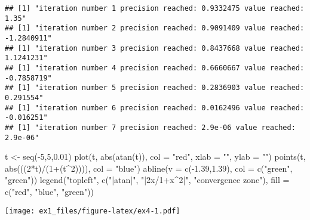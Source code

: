 \documentclass[
]{article}
\newenvironment{Shaded}{\begin{snugshade}}{\end{snugshade}}
\newcommand{\AttributeTok}[1]{\textcolor[rgb]{0.77,0.63,0.00}{#1}}
\newcommand{\DecValTok}[1]{\textcolor[rgb]{0.00,0.00,0.81}{#1}}
\newcommand{\FloatTok}[1]{\textcolor[rgb]{0.00,0.00,0.81}{#1}}
\newcommand{\FunctionTok}[1]{\textcolor[rgb]{0.00,0.00,0.00}{#1}}
\newcommand{\NormalTok}[1]{#1}
\newcommand{\OtherTok}[1]{\textcolor[rgb]{0.56,0.35,0.01}{#1}}
\newcommand{\SpecialCharTok}[1]{\textcolor[rgb]{0.00,0.00,0.00}{#1}}
\newcommand{\StringTok}[1]{\textcolor[rgb]{0.31,0.60,0.02}{#1}}
\begin{document}
\begin{verbatim}
## [1] "iteration number 1 precision reached: 0.9332475 value reached: 1.35"
## [1] "iteration number 2 precision reached: 0.9091409 value reached: -1.2840911"
## [1] "iteration number 3 precision reached: 0.8437668 value reached: 1.1241231"
## [1] "iteration number 4 precision reached: 0.6660667 value reached: -0.7858719"
## [1] "iteration number 5 precision reached: 0.2836903 value reached: 0.291554"
## [1] "iteration number 6 precision reached: 0.0162496 value reached: -0.016251"
## [1] "iteration number 7 precision reached: 2.9e-06 value reached: 2.9e-06"
\end{verbatim}

\begin{Shaded}
\begin{Highlighting}[]
\NormalTok{t }\OtherTok{\textless{}{-}} \FunctionTok{seq}\NormalTok{(}\SpecialCharTok{{-}}\DecValTok{5}\NormalTok{,}\DecValTok{5}\NormalTok{,}\FloatTok{0.01}\NormalTok{)}
\FunctionTok{plot}\NormalTok{(t, }\FunctionTok{abs}\NormalTok{(}\FunctionTok{atan}\NormalTok{(t)), }\AttributeTok{col =} \StringTok{"red"}\NormalTok{, }\AttributeTok{xlab =} \StringTok{""}\NormalTok{, }\AttributeTok{ylab =} \StringTok{""}\NormalTok{)}
\FunctionTok{points}\NormalTok{(t, }\FunctionTok{abs}\NormalTok{(((}\DecValTok{2}\SpecialCharTok{*}\NormalTok{t)}\SpecialCharTok{/}\NormalTok{(}\DecValTok{1}\SpecialCharTok{+}\NormalTok{(t}\SpecialCharTok{\^{}}\DecValTok{2}\NormalTok{)))), }\AttributeTok{col =} \StringTok{"blue"}\NormalTok{)}
\FunctionTok{abline}\NormalTok{(}\AttributeTok{v =} \FunctionTok{c}\NormalTok{(}\SpecialCharTok{{-}}\FloatTok{1.39}\NormalTok{,}\FloatTok{1.39}\NormalTok{), }\AttributeTok{col =} \FunctionTok{c}\NormalTok{(}\StringTok{"green"}\NormalTok{, }\StringTok{"green"}\NormalTok{))}
\FunctionTok{legend}\NormalTok{(}\StringTok{"topleft"}\NormalTok{, }\FunctionTok{c}\NormalTok{(}\StringTok{"|atan|"}\NormalTok{, }\StringTok{"|2x/1+x\^{}2|"}\NormalTok{, }\StringTok{"convergence zone"}\NormalTok{), }\AttributeTok{fill =} \FunctionTok{c}\NormalTok{(}\StringTok{"red"}\NormalTok{, }\StringTok{"blue"}\NormalTok{, }\StringTok{"green"}\NormalTok{))}
\end{Highlighting}
\end{Shaded}

\texttt{[image: ex1\_files/figure-latex/ex4-1.pdf]}
\end{document}
